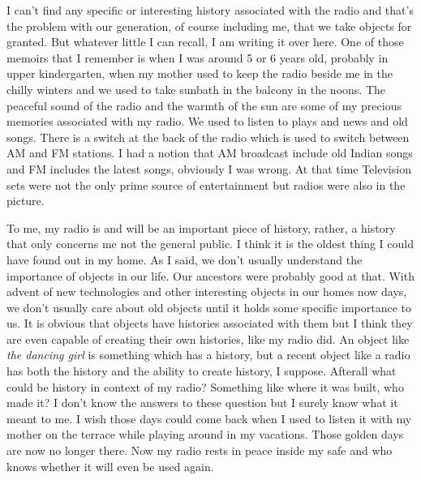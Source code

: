 \documentclass{article}
\begin{document}
\par I can't find any specific or interesting history associated with the radio and that's the problem with our generation, of course including me, that we take objects for granted. But whatever little I can recall, I am writing it over here. One of those memoirs that I remember is when I was around 5 or 6 years old, probably in upper kindergarten, when my mother used to keep the radio beside me in the chilly winters and we used to take sunbath in the balcony in the noons. The peaceful sound of the radio and the warmth of the sun are some of my precious memories associated with my radio. We used to listen to plays and news and old songs. There is a switch at the back of the radio which is used to switch between AM and FM stations. I had a notion that AM broadcast include old Indian songs and FM includes the latest songs, obviously I was wrong. At that time Television sets were not the only prime source of entertainment but radios were also in the picture.

\par To me, my radio is and will be an important piece of history, rather, a history that only concerns me not the general public. I think it is the oldest thing I could have found out in my home. As I said, we don't usually understand the importance of objects in our life. Our ancestors were probably good at that. With advent of new technologies and other interesting objects in our homes now days, we don't usually care about old objects until it holds some specific importance to us. It is obvious that objects have histories associated with them but I think they are even capable of creating their own histories, like my radio did. An object like \textit{the dancing girl} is something which has a history, but a recent object like a radio has both the history and the ability to create history, I suppose. Afterall what could be history in context of my radio? Something like where it was built, who made it? I don't know the answers to these question but I surely know what it meant to me. I wish those days could come back when I used to listen it with my mother on the terrace while playing around in my vacations. Those golden days are now no longer there. Now my radio rests in peace inside my safe and who knows whether it will even be used again.
\\
\begin{center}
\decoone \decoone \decoone
\end{center}
\end{document}
